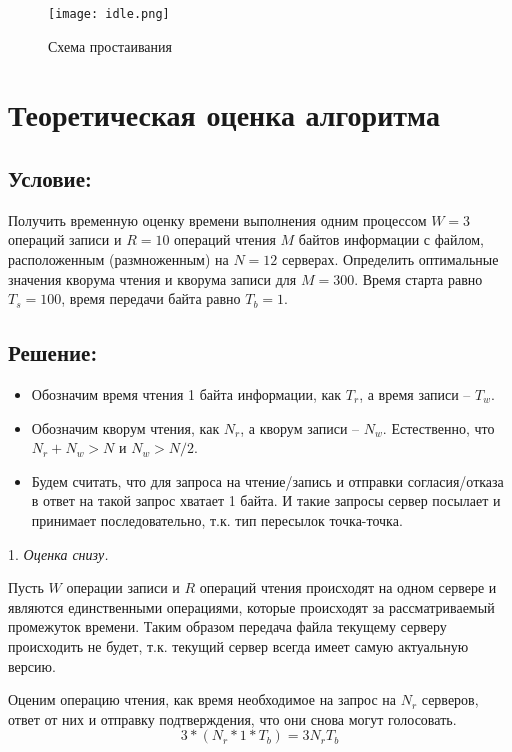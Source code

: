 \begin{figure}[H]
    \centering
    \texttt{[image: idle.png]}
    \caption{Схема простаивания}
    \label{fig:idle}
\end{figure}


\section*{Теоретическая оценка алгоритма}

\subsection*{Условие:}

Получить временную оценку времени выполнения одним процессом $W = 3$ операций
записи и $R = 10$ операций чтения $M$ байтов информации с файлом, расположенным
(размноженным) на $N = 12$ серверах. Определить оптимальные значения кворума чтения
и кворума записи для $M = 300$. Время старта равно $T_s = 100$, время передачи
байта равно $T_b = 1$.

\subsection*{Решение:}

\begin{itemize}
    \item Обозначим время чтения 1 байта информации, как $T_r$, а время
        записи -- $T_w$.
    \item Обозначим кворум чтения, как $N_r$, а кворум записи -- $N_w$.
        Естественно, что $N_r + N_w > N$ и $N_w > N / 2$.
    \item Будем считать, что для запроса на чтение/запись и отправки
        согласия/отказа в ответ на такой запрос хватает 1 байта. И такие
        запросы сервер посылает и принимает последовательно,
        т.к. тип пересылок точка-точка.
\end{itemize}

1. \textit{Оценка снизу.}

Пусть $W$ операции записи и $R$ операций чтения
происходят на одном сервере и являются единственными операциями, которые
происходят за рассматриваемый промежуток времени. Таким образом передача
файла текущему серверу происходить не будет, т.к. текущий сервер всегда имеет
самую актуальную версию.

Оценим операцию чтения, как время необходимое на запрос на $N_r$ серверов,
ответ от них и отправку подтверждения, что они снова могут голосовать.
$$
3*(N_r * 1 * T_b) = 3N_rT_b
$$

